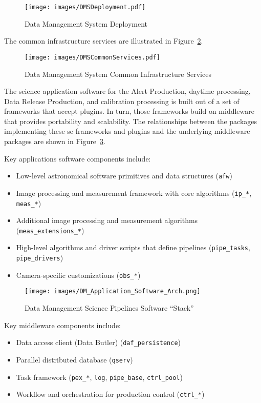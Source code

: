 \documentclass[DM,lsstdraft,toc]{lsstdoc}
\begin{document}
\begin{figure}
\centering
\texttt{[image: images/DMSDeployment.pdf]}
\caption{Data Management System Deployment}
\label{fig:deployment}
\end{figure}

The common infrastructure services are illustrated in Figure~\ref{fig:commonservices}.

\begin{figure}
\centering
\texttt{[image: images/DMSCommonServices.pdf]}
\caption{Data Management System Common Infrastructure Services}
\label{fig:commonservices}
\end{figure}

The science application software for the Alert Production, daytime
processing, Data Release Production, and calibration processing is built
out of a set of frameworks that accept plugins. In turn, those
frameworks build on middleware that provides portability and
scalability.  The relationships between the packages implementing
these se frameworks and plugins and the underlying middleware packages
are shown in Figure~\ref{fig:scipi}.

Key applications software components include:
\begin{itemize}
\item
  Low-level astronomical software primitives and data structures
  (\texttt{afw})
\item
  Image processing and measurement framework with core algorithms
  (\texttt{ip\_*}, \texttt{meas\_*})
\item
  Additional image processing and measurement algorithms
  (\texttt{meas\_extensions\_*})
\item
  High-level algorithms and driver scripts that define pipelines
  (\texttt{pipe\_tasks}, \texttt{pipe\_drivers})
\item
  Camera-specific customizations (\texttt{obs\_*})
\end{itemize}

\begin{figure}
\centering
\texttt{[image: images/DM\_Application\_Software\_Arch.png]}
\caption{Data Management Science Pipelines Software ``Stack''}
\label{fig:scipi}
\end{figure}

Key middleware components include:
\begin{itemize}
\item
  Data access client (Data Butler) (\texttt{daf\_persistence})
\item
  Parallel distributed database (\texttt{qserv})
\item
  Task framework (\texttt{pex\_*}, \texttt{log}, \texttt{pipe\_base},
  \texttt{ctrl\_pool})
\item
  Workflow and orchestration for production control (\texttt{ctrl\_*})
\end{itemize}
\end{document}
